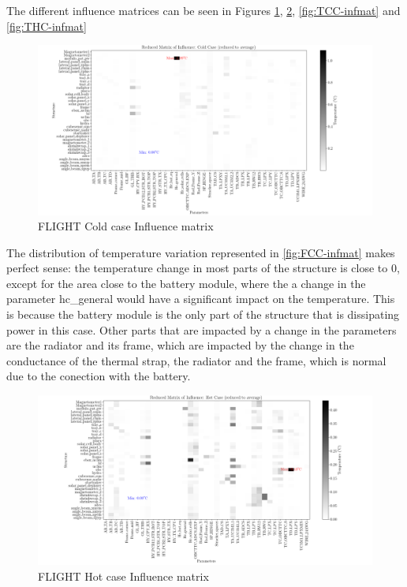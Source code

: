 The different influence matrices can be seen in Figures \ref{fig:FCC-infmat}, \ref{fig:FHC-infmat}, \ref{fig:TCC-infmat}  and \ref{fig:THC-infmat}
\begin{figure}[H]
    \centering
    \includegraphics[width = \linewidth]{Figures/UPMSat3/Flight/Nuevas/infmatCC.png}
    \caption{FLIGHT Cold case Influence matrix}
    \label{fig:FCC-infmat}
\end{figure}
The distribution of temperature variation represented in \autoref{fig:FCC-infmat} makes perfect sense: the temperature change in most parts of the structure is close to 0, except for the area close to the battery module, where the a change in the parameter hc\_general would have a significant impact on the temperature. This is because the battery module is the only part of the structure that is dissipating power in this case. Other parts that are impacted by a change in the parameters are the radiator and its frame, which are impacted by the change in the conductance of the thermal strap, the radiator and the frame, which is normal due to the conection with the battery.
\begin{figure}[H]
    \centering
    \includegraphics[width = \linewidth]{Figures/UPMSat3/Flight/Nuevas/infmatHC.png}
    \caption{FLIGHT Hot case Influence matrix}
    \label{fig:FHC-infmat}
\end{figure}
